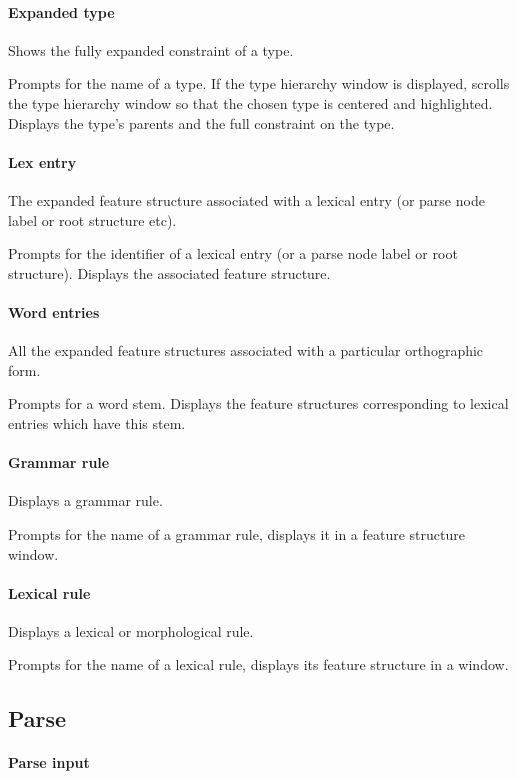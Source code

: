 \documentclass[12pt]{report}
\begin{document}
\paragraph{Expanded type}
\label{type-exp}
Shows the fully expanded constraint of a type.

Prompts for the name of a type. 
If the type hierarchy window is displayed, scrolls the
type hierarchy window so that the chosen type is centered and
highlighted.  
Displays the type's
parents and the full constraint on the type.

\paragraph{Lex entry}
\label{psort-exp}
The expanded feature structure associated with a lexical entry
(or parse node label or root structure etc).

Prompts for the identifier of a lexical entry (or a parse node
label or root structure).
Displays the associated feature structure.

\paragraph{Word entries}
All the expanded feature structures associated with a particular
orthographic form.

Prompts for a word stem.
Displays the feature structures corresponding to lexical entries
which have this stem.

\paragraph{Grammar rule}
Displays a grammar rule.

Prompts for the name of a grammar rule, displays it in a
feature structure window.

\paragraph{Lexical rule}
Displays a lexical or morphological rule.

Prompts for the name of a lexical rule, displays its feature structure in a
window.

\subsection{Parse}
\label{parsecommands}

\paragraph{Parse input}
\end{document}
